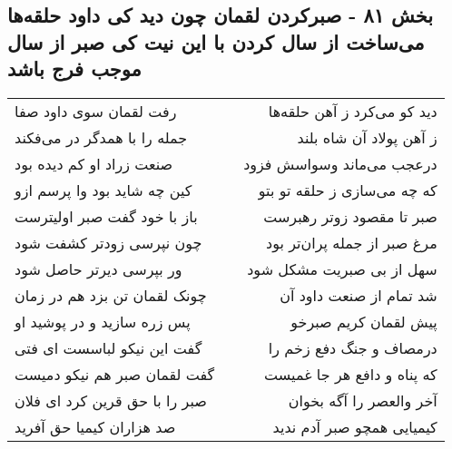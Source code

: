 \begin{center}
\section*{بخش ۸۱ - صبرکردن لقمان چون دید کی داود حلقه‌ها می‌ساخت از سال کردن با این نیت کی صبر از سال موجب فرج باشد}
\label{sec:sh081}
\begin{longtable}{l p{0.5cm} r}
رفت لقمان سوی داود صفا
&&
دید کو می‌کرد ز آهن حلقه‌ها
\\
جمله را با همدگر در می‌فکند
&&
ز آهن پولاد آن شاه بلند
\\
صنعت زراد او کم دیده بود
&&
درعجب می‌ماند وسواسش فزود
\\
کین چه شاید بود وا پرسم ازو
&&
که چه می‌سازی ز حلقه تو بتو
\\
باز با خود گفت صبر اولیترست
&&
صبر تا مقصود زوتر رهبرست
\\
چون نپرسی زودتر کشفت شود
&&
مرغ صبر از جمله پران‌تر بود
\\
ور بپرسی دیرتر حاصل شود
&&
سهل از بی صبریت مشکل شود
\\
چونک لقمان تن بزد هم در زمان
&&
شد تمام از صنعت داود آن
\\
پس زره سازید و در پوشید او
&&
پیش لقمان کریم صبرخو
\\
گفت این نیکو لباسست ای فتی
&&
درمصاف و جنگ دفع زخم را
\\
گفت لقمان صبر هم نیکو دمیست
&&
که پناه و دافع هر جا غمیست
\\
صبر را با حق قرین کرد ای فلان
&&
آخر والعصر را آگه بخوان
\\
صد هزاران کیمیا حق آفرید
&&
کیمیایی همچو صبر آدم ندید
\\
\end{longtable}
\end{center}
